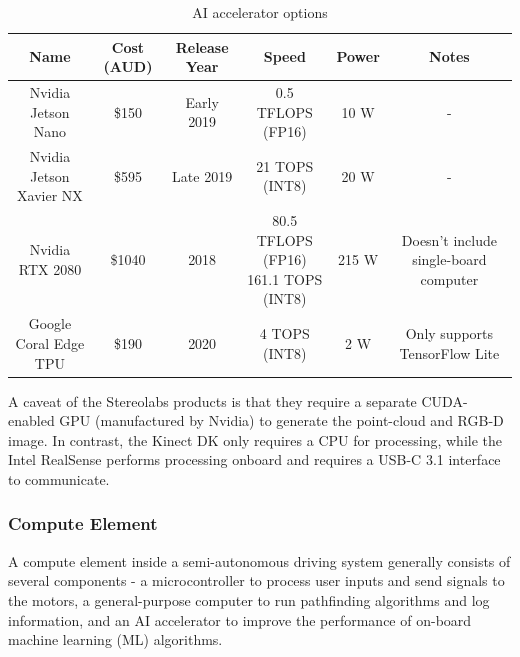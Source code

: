 \begin{landscape}
\begin{table}[H]
    \centering
\begin{adjustbox}{width=1.3\textwidth}
    \begin{tabular}{c c c c c c}
    \toprule
    Name & Cost (AUD)\footnotemark[1] & Release Year & Speed & Power & Notes \\
    \midrule
    Nvidia Jetson Nano \cite{nvidiaJetsonNanoSystemonModule2019} & \$150 & Early 2019 & 0.5 TFLOPS (FP16) & 10 W & - \\
    Nvidia Jetson Xavier NX \cite{nvidiaJetsonXavierNX2019} & \$595 & Late 2019 & 21 TOPS (INT8) & 20 W & - \\
    Nvidia RTX 2080 \cite{nvidiaTuringGPUArchitecture2018} & \$1040 & 2018 & \makecell{80.5 TFLOPS (FP16)\\161.1 TOPS (INT8)} & 215 W & Doesn't include single-board computer \\
    Google Coral Edge TPU \cite{googlecoralCoralDevBoard2020} & \$190 & 2020 & 4 TOPS (INT8) & 2 W & Only supports TensorFlow Lite \\
    \bottomrule
    \end{tabular}
\end{adjustbox}
    \caption{AI accelerator options}
    \label{table:compute_element}
\end{table}
\end{landscape}


A caveat of the Stereolabs products is that they require a separate CUDA-enabled GPU (manufactured by Nvidia) to generate the point-cloud
and RGB-D image. In contrast, the Kinect DK only requires a CPU for processing, while the Intel RealSense performs processing onboard
and requires a USB-C 3.1 interface to communicate.

\subsubsection{Compute Element}
A compute element inside a semi-autonomous driving system generally consists of several components -
a microcontroller to process user inputs and
send signals to the motors, a general-purpose computer to run pathfinding algorithms and log information,
and an AI accelerator to improve the performance of on-board machine learning (ML) algorithms.

